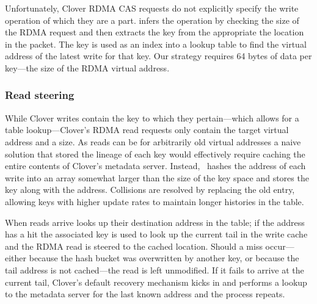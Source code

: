 Unfortunately, Clover RDMA CAS requests do not explicitly specify the
write operation of which they are a part.  {\sword} infers the
operation by checking the size of the RDMA request and then extracts
the key from the appropriate the location in the packet.  The key is
used as an index into a lookup table to find the virtual address of
the latest write for that key.  Our strategy requires 64 bytes of
data per key---the size of the RDMA virtual address.


\subsubsection{Read steering}

While Clover 
writes contain the key
to which they pertain---which allows for a table lookup---Clover's
RDMA read requests only contain the target virtual address and a size.
As reads can be for arbitrarily old virtual addresses a naive solution
that stored the lineage of each key would effectively require caching
the entire contents of Clover's metadata server.  Instead,
\sword\ hashes the address of each write into an array somewhat larger
than the size of the key space and stores the key along with the
address.  Collisions are resolved by replacing the old
entry, allowing keys with higher update rates to
maintain longer histories in the table.

When reads arrive {\sword} looks up their destination address in the
table; if the address has a hit the associated key is used to look up
the current tail in the write cache and the RDMA read is steered to
the cached location.  Should a miss occur---either because the hash
bucket was overwritten by another key, or because the tail address is
not cached---the read is left unmodified.  If it fails to arrive at
the current tail, Clover's default recovery mechanism kicks in and
performs a lookup to the metadata server for the last known address
and the process repeats.
